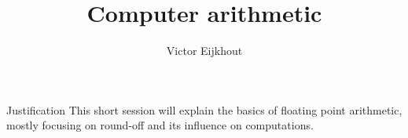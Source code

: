 \documentclass[11pt,headernav]{beamer}
\begin{document}
\title{Computer arithmetic}
\author[Eijkhout]{Victor Eijkhout}
\date{\hpcsemester}

\begin{frame}
  \titlepage
\end{frame}

\begin{frame}{Justification}
  This short session will explain the basics of floating point
  arithmetic, mostly focusing on round-off and its influence
  on computations.
\end{frame}


\end{document}
